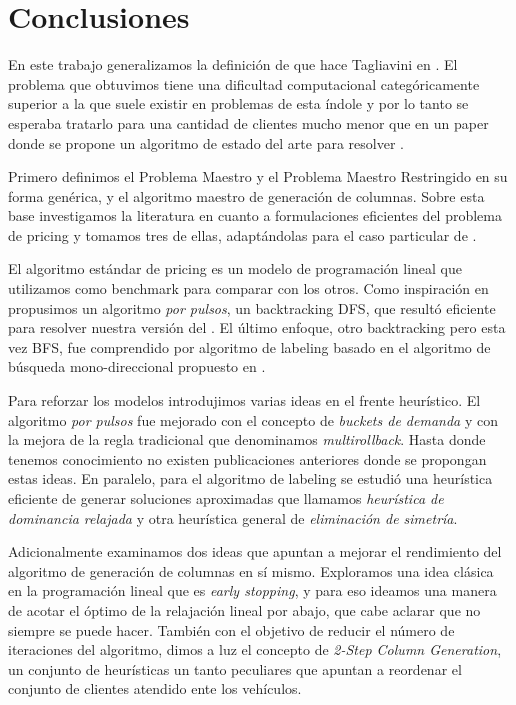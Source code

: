 \chapter{Conclusiones}

En este trabajo generalizamos la definición de  que hace Tagliavini en \cite{tagliavini}. El problema que obtuvimos tiene una dificultad computacional categóricamente superior a la que suele existir en problemas de esta índole y por lo tanto se esperaba tratarlo para una cantidad de clientes mucho menor que en un paper donde se propone un algoritmo de estado del arte para resolver . 

Primero definimos el Problema Maestro y el Problema Maestro Restringido en su forma genérica, y el algoritmo maestro de generación de columnas. Sobre esta base investigamos la literatura en cuanto a formulaciones eficientes del problema de pricing y tomamos tres de ellas, adaptándolas para el caso particular de .

El algoritmo estándar de pricing es un modelo de programación lineal que utilizamos como benchmark para comparar con los otros. Como inspiración en \cite{lozano-duque-medaglia} propusimos un algoritmo \emph{por pulsos}, un backtracking DFS, que resultó eficiente para resolver nuestra versión del . El último enfoque, otro backtracking pero esta vez BFS, fue comprendido por algoritmo de labeling basado en el algoritmo de búsqueda mono-direccional propuesto en \cite{righini-salani}. 

Para reforzar los modelos introdujimos varias ideas en el frente heurístico. El algoritmo \emph{por pulsos} fue mejorado con el concepto de \emph{buckets de demanda} y con la mejora de la regla tradicional que denominamos \emph{multirollback}. Hasta donde tenemos conocimiento no existen publicaciones anteriores donde se propongan estas ideas. En paralelo, para el algoritmo de labeling se estudió una heurística eficiente de generar soluciones aproximadas que llamamos \emph{heurística de dominancia relajada} y otra heurística general de \emph{eliminación de simetría}.

Adicionalmente examinamos dos ideas que apuntan a mejorar el rendimiento del algoritmo de generación de columnas en sí mismo. Exploramos una idea clásica en la programación lineal que es \emph{early stopping}, y para eso ideamos una manera de acotar el óptimo de la relajación lineal por abajo, que cabe aclarar que no siempre se puede hacer. También con el objetivo de reducir el número de iteraciones del algoritmo, dimos a luz el concepto de \emph{2-Step Column Generation}, un conjunto de heurísticas un tanto peculiares que apuntan a reordenar el conjunto de clientes atendido ente los vehículos.


